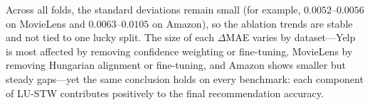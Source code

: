 Across all folds, the standard deviations remain small (for example, $0.0052$--$0.0056$ on MovieLens and $0.0063$--$0.0105$ on Amazon), so the ablation trends are stable and not tied to one lucky split. The size of each $\Delta$MAE varies by dataset---Yelp is most affected by removing confidence weighting or fine-tuning, MovieLens by removing Hungarian alignment or fine-tuning, and Amazon shows smaller but steady gaps---yet the same conclusion holds on every benchmark: each component of LU-STW contributes positively to the final recommendation accuracy.
